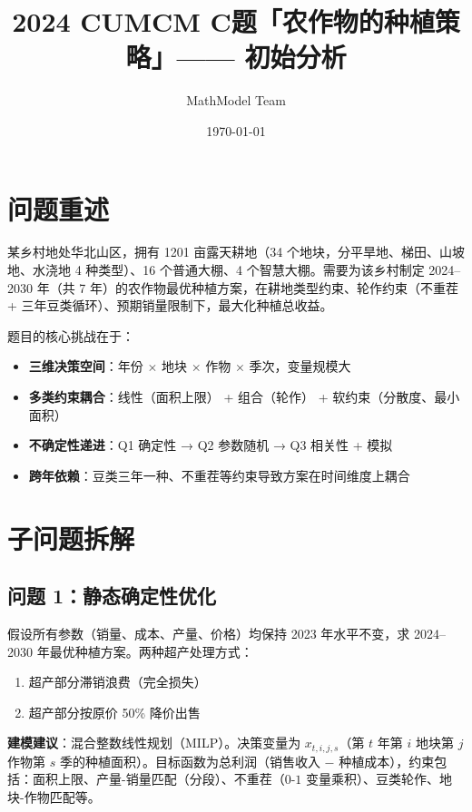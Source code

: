 \documentclass{internal-report}
\title{2024 CUMCM C题「农作物的种植策略」—— 初始分析}
\author{MathModel Team}
\date{\today}
\begin{document}
\maketitle

\section{问题重述}

某乡村地处华北山区，拥有 1201 亩露天耕地（34 个地块，分平旱地、梯田、山坡地、水浇地 4 种类型）、16 个普通大棚、4 个智慧大棚。需要为该乡村制定 2024--2030 年（共 7 年）的农作物最优种植方案，在耕地类型约束、轮作约束（不重茬 + 三年豆类循环）、预期销量限制下，最大化种植总收益。

题目的核心挑战在于：
\begin{itemize}
    \item \textbf{三维决策空间}：年份 $\times$ 地块 $\times$ 作物 $\times$ 季次，变量规模大
    \item \textbf{多类约束耦合}：线性（面积上限） + 组合（轮作） + 软约束（分散度、最小面积）
    \item \textbf{不确定性递进}：Q1 确定性 → Q2 参数随机 → Q3 相关性 + 模拟
    \item \textbf{跨年依赖}：豆类三年一种、不重茬等约束导致方案在时间维度上耦合
\end{itemize}

\section{子问题拆解}

\subsection{问题 1：静态确定性优化}

假设所有参数（销量、成本、产量、价格）均保持 2023 年水平不变，求 2024--2030 年最优种植方案。两种超产处理方式：
\begin{enumerate}
    \item 超产部分滞销浪费（完全损失）
    \item 超产部分按原价 50\% 降价出售
\end{enumerate}

\textbf{建模建议}：混合整数线性规划（MILP）。决策变量为 $x_{t,i,j,s}$（第 $t$ 年第 $i$ 地块第 $j$ 作物第 $s$ 季的种植面积）。目标函数为总利润（销售收入 $-$ 种植成本），约束包括：面积上限、产量-销量匹配（分段）、不重茬（$0$-$1$ 变量乘积）、豆类轮作、地块-作物匹配等。
\end{document}
